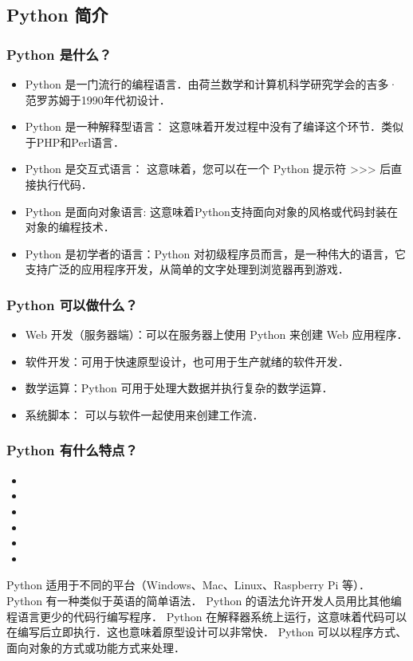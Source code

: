 
\begin{issues}
\issueTODO
\end{issues}

\subsection{Python 简介}

\subsubsection{Python 是什么？}

\begin{itemize}
\item Python 是一门流行的编程语言．由荷兰数学和计算机科学研究学会的吉多·范罗苏姆于1990年代初设计．
\item Python 是一种解释型语言： 这意味着开发过程中没有了编译这个环节．类似于PHP和Perl语言．
\item Python 是交互式语言： 这意味着，您可以在一个 Python 提示符 >>> 后直接执行代码．
\item Python 是面向对象语言: 这意味着Python支持面向对象的风格或代码封装在对象的编程技术．
\item Python 是初学者的语言：Python 对初级程序员而言，是一种伟大的语言，它支持广泛的应用程序开发，从简单的文字处理到浏览器再到游戏．
\end{itemize}
 
\subsubsection{Python 可以做什么？}
\begin{itemize}
\item Web 开发（服务器端）：可以在服务器上使用 Python 来创建 Web 应用程序．
\item 软件开发：可用于快速原型设计，也可用于生产就绪的软件开发．
\item 数学运算：Python 可用于处理大数据并执行复杂的数学运算．
\item 系统脚本： 可以与软件一起使用来创建工作流．
\end{itemize}

\subsubsection{Python 有什么特点？}

\begin{itemize}
\item 
\item 
\item 
\item 
\item 
\item 
\end{itemize}
    Python 适用于不同的平台（Windows、Mac、Linux、Raspberry Pi 等）．
    Python 有一种类似于英语的简单语法．
    Python 的语法允许开发人员用比其他编程语言更少的代码行编写程序．
    Python 在解释器系统上运行，这意味着代码可以在编写后立即执行．这也意味着原型设计可以非常快．
    Python 可以以程序方式、面向对象的方式或功能方式来处理．


